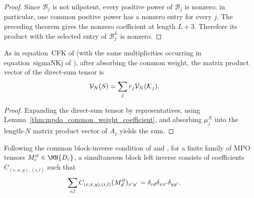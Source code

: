 \begin{proof}\leanok
    Since $\mathcal B_j$ is not nilpotent, every positive power of
    $\mathcal B_j$ is nonzero; in particular, one common positive power has a
    nonzero entry for every $j$. The preceding theorem gives the nonzero
    coefficient at length $L+3$. Therefore its product with the selected
    entry of $\mathcal B_j^L$ is nonzero.
\end{proof}

\begin{lemma}
    \label{thm:mpdo_common_weight_absorbed_mpv}
    \leanok
    As in equation~CFK of
    \cite[Appendix~C.2, lines~1660--1665]{Cirac2016MPDO_arXiv} (with the same
    multiplicities occurring in equation~sigmaNKj of
    \cite[Appendix~C.2, lines~1756--1759]{Cirac2016MPDO_arXiv}), after absorbing
    the common weight, the matrix product vector of the direct-sum tensor is
    \begin{align}
        \mathcal V_N(S) & =\sum_j r_j\mathcal V_N(\mathcal K_j).
        \notag
    \end{align}
\end{lemma}

\begin{proof}\leanok
    Expanding the direct-sum tensor by representatives, using
    Lemma~\ref{thm:mpdo_common_weight_coefficient}, and absorbing
    $\mu_j^N$ into the length-$N$ matrix product vector of $A_j$ yields the
    sum.
\end{proof}

\begin{definition}
    \label{def:mpdo_block_left_inverse}
    \leanok
    Following the common block-inverse condition of
    \cite[Appendix~C.2, lines~1666--1676]{Cirac2016MPDO_arXiv} and
    \cite[lines~269--277]{Bultinck2017Anyons}, for a finite family of MPO
    tensors $M_c^{il}\in \MN{D_c}$, a simultaneous block left inverse
    consists of coefficients $C_{(c,x,y),(i,l)}$ such that
    \begin{align}
        \sum_{i,l}C_{(c,x,y),(i,l)}(M_d^{il})_{x'y'}
         & =\delta_{cd}\delta_{xx'}\delta_{yy'}.
        \notag
    \end{align}
\end{definition}


